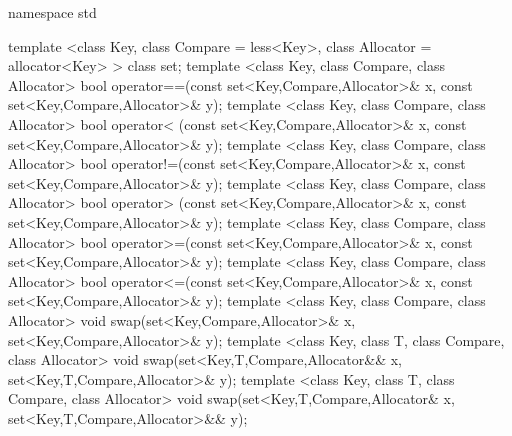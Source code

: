 \documentclass[american,twoside]{book}
\begin{document}
%

\begin{codeblock}
namespace std {
  template <class Key, class Compare = less<Key>,
            class Allocator = allocator<Key> >
    class set;
  template <class Key, class Compare, class Allocator>
    bool operator==(const set<Key,Compare,Allocator>& x,
                    const set<Key,Compare,Allocator>& y);
  template <class Key, class Compare, class Allocator>
    bool operator< (const set<Key,Compare,Allocator>& x,
                    const set<Key,Compare,Allocator>& y);
  template <class Key, class Compare, class Allocator>
    bool operator!=(const set<Key,Compare,Allocator>& x,
                    const set<Key,Compare,Allocator>& y);
  template <class Key, class Compare, class Allocator>
    bool operator> (const set<Key,Compare,Allocator>& x,
                    const set<Key,Compare,Allocator>& y);
  template <class Key, class Compare, class Allocator>
    bool operator>=(const set<Key,Compare,Allocator>& x,
                    const set<Key,Compare,Allocator>& y);
  template <class Key, class Compare, class Allocator>
    bool operator<=(const set<Key,Compare,Allocator>& x,
                    const set<Key,Compare,Allocator>& y);
  template <class Key, class Compare, class Allocator>
    void swap(set<Key,Compare,Allocator>& x,
              set<Key,Compare,Allocator>& y);
  template <class Key, class T, class Compare, class Allocator>
    void swap(set<Key,T,Compare,Allocator&& x,
              set<Key,T,Compare,Allocator>& y);
  template <class Key, class T, class Compare, class Allocator>
    void swap(set<Key,T,Compare,Allocator& x,
              set<Key,T,Compare,Allocator>&& y);

}
\end{codeblock}
\end{document}
